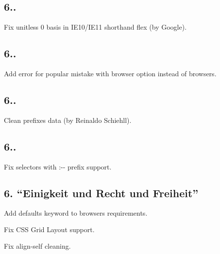 \subsection*{6..}


\begin{DoxyItemize}
\item Fix unitless 0 basis in I\+E10/\+I\+E11 shorthand flex (by Google).
\end{DoxyItemize}

\subsection*{6..}


\begin{DoxyItemize}
\item Add error for popular mistake with {\ttfamily browser} option instead of {\ttfamily browsers}.
\end{DoxyItemize}

\subsection*{6..}


\begin{DoxyItemize}
\item Clean prefixes data (by Reinaldo Schiehll).
\end{DoxyItemize}

\subsection*{6..}


\begin{DoxyItemize}
\item Fix selectors with {\ttfamily \+:-\/-\/} prefix support.
\end{DoxyItemize}

\subsection*{6. “\+Einigkeit und Recht und Freiheit”}


\begin{DoxyItemize}
\item Add {\ttfamily defaults} keyword to browsers requirements.
\item Fix C\+SS Grid Layout support.
\item Fix {\ttfamily align-\/self} cleaning.
\end{DoxyItemize}

